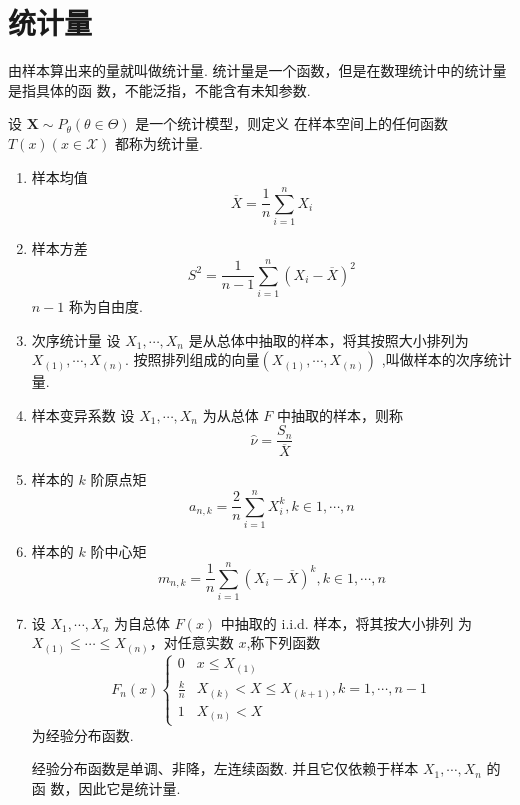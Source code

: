\documentclass[openany]{book}
\begin{document}
\section{统计量}
由样本算出来的量就叫做统计量. 统计量是一个函数，但是在数理统计中的统计量是指具体的函
数，不能泛指，不能含有未知参数.
\begin{definition}
  设 $\mathbf{X} \sim P_\theta(\theta \in \Theta)$ 是一个统计模型，则定义
  在样本空间上的任何函数 $T(x)(x\in\mathscr{X})$ 都称为统计量.
\end{definition}
\begin{enumerate}
  \item  样本均值
  \begin{equation}
   \overline{X} = \frac{1}{n}\sum_{i=1}^{n}X_i
  \end{equation}
  \item 样本方差
  \begin{equation}
   S^2 = \frac{1}{n-1}\sum_{i=1}^{n}(X_i - \overline{X})^2
  \end{equation}
  $n-1$ 称为自由度.
  \item 次序统计量
  设 $X_1,\cdots,X_n$ 是从总体中抽取的样本，将其按照大小排列为
  $X_{(1)},\cdots,X_{(n)} $.
  按照排列组成的向量$(X_{(1)},\cdots,X_{(n)})$ ,叫做样本的次序统计量.
  \item 样本变异系数
  设 $X_1,\cdots,X_n$ 为从总体 $F$ 中抽取的样本，则称
  \begin{equation}
   \hat{\nu} = \frac{S_n}{\overline{X}}
  \end{equation}
  \item 样本的 $k$ 阶原点矩
  \begin{equation}
   a_{n,k} = \frac{2}{n} \sum_{i=1}^{n} X_i^k,  k \in 1,\cdots,n
  \end{equation}
  \item 样本的 $k$ 阶中心矩
  \begin{equation}
   m_{n,k} = \frac{1}{n} \sum_{i=1}^{n} (X_i - \overline{X})^k,  k
   \in 1,\cdots,n
  \end{equation}
  \item
  \begin{definition}
   设  $X_1,\cdots,X_n$ 为自总体 $F(x)$ 中抽取的 i.i.d. 样本，将其按大小排列
   为  $X_{(1)} \leq \cdots \leq X_{(n)}$，对任意实数 $x$,称下列函数
   \begin{equation}
    F_n(x)\begin{cases}
      0& x\leq X_{(1)} \\
      \frac kn & X_{(k)} < X \leq X_{(k+1)} ,k = 1,\cdots,n-1  \\
      1& X_{(n)} < X
    \end{cases}
   \end{equation}
  为经验分布函数.
  \end{definition}
  经验分布函数是单调、非降，左连续函数. 并且它仅依赖于样本 $X_1,\cdots,X_n$ 的函
  数，因此它是统计量.
\end{enumerate}
\end{document}
